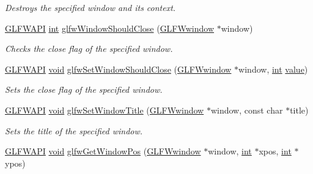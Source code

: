 \begin{DoxyCompactItemize}
\begin{DoxyCompactList}\small\item\em Destroys the specified window and its context. \end{DoxyCompactList}\item 
\hyperlink{glfw3_8h_a56da5036b2cc259351ae22fd6439bb47}{G\+L\+F\+W\+A\+P\+I} \hyperlink{wglew_8h_a500a82aecba06f4550f6849b8099ca21}{int} \hyperlink{group__window_gaa6162f67dfa38b8beda2fea623649332}{glfw\+Window\+Should\+Close} (\hyperlink{group__window_ga3c96d80d363e67d13a41b5d1821f3242}{G\+L\+F\+Wwindow} $\ast$window)
\begin{DoxyCompactList}\small\item\em Checks the close flag of the specified window. \end{DoxyCompactList}\item 
\hyperlink{glfw3_8h_a56da5036b2cc259351ae22fd6439bb47}{G\+L\+F\+W\+A\+P\+I} \hyperlink{wglew_8h_aeea6e3dfae3acf232096f57d2d57f084}{void} \hyperlink{group__window_ga1cadeda7a1e2f224e06a8415d30741aa}{glfw\+Set\+Window\+Should\+Close} (\hyperlink{group__window_ga3c96d80d363e67d13a41b5d1821f3242}{G\+L\+F\+Wwindow} $\ast$window, \hyperlink{wglew_8h_a500a82aecba06f4550f6849b8099ca21}{int} \hyperlink{glew_8h_a6a4f8a1a444e9080b297963b3db29fe0}{value})
\begin{DoxyCompactList}\small\item\em Sets the close flag of the specified window. \end{DoxyCompactList}\item 
\hyperlink{glfw3_8h_a56da5036b2cc259351ae22fd6439bb47}{G\+L\+F\+W\+A\+P\+I} \hyperlink{wglew_8h_aeea6e3dfae3acf232096f57d2d57f084}{void} \hyperlink{group__window_ga861ed3414ab8120e2f74151a666ed1dc}{glfw\+Set\+Window\+Title} (\hyperlink{group__window_ga3c96d80d363e67d13a41b5d1821f3242}{G\+L\+F\+Wwindow} $\ast$window, const char $\ast$title)
\begin{DoxyCompactList}\small\item\em Sets the title of the specified window. \end{DoxyCompactList}\item 
\hyperlink{glfw3_8h_a56da5036b2cc259351ae22fd6439bb47}{G\+L\+F\+W\+A\+P\+I} \hyperlink{wglew_8h_aeea6e3dfae3acf232096f57d2d57f084}{void} \hyperlink{group__window_ga0076a8591ef7494d359730cf2250b45b}{glfw\+Get\+Window\+Pos} (\hyperlink{group__window_ga3c96d80d363e67d13a41b5d1821f3242}{G\+L\+F\+Wwindow} $\ast$window, \hyperlink{wglew_8h_a500a82aecba06f4550f6849b8099ca21}{int} $\ast$xpos, \hyperlink{wglew_8h_a500a82aecba06f4550f6849b8099ca21}{int} $\ast$ypos)

\end{DoxyCompactItemize}
